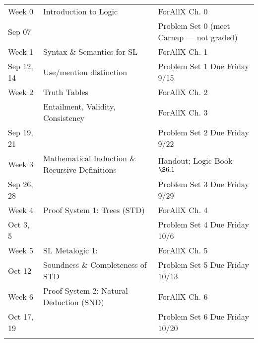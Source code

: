 \documentclass[letterpaper]{inzane_syllabus} %
\begin{document}
\begin{center}
\begin{tabularx}{\textwidth}{p{2.5cm}p{8cm}p{9cm}} %
\arrayrulecolor{myCOLOR}\hline
\multicolumn{3}{l}{\textbf{\textcolor{myCOLOR}{\large Part 1: Sentential Logic}}} \\
\hline

Week 0 & Introduction to Logic & ForAllX Ch. 0 \\
Sep 07 & & Problem Set 0 (meet Carnap --- not graded)\\
\arrayrulecolor{maingray}\hline

Week 1 & Syntax \& Semantics for SL & ForAllX Ch. 1\\
Sep 12, 14 & Use/mention distinction & Problem Set 1 Due Friday 9/15  \\
\arrayrulecolor{maingray}\hline

Week 2 & Truth Tables & ForAllX Ch. 2 \\
& Entailment, Validity, Consistency & ForAllX Ch. 3 \\
Sep 19, 21 & & Problem Set 2 Due Friday 9/22 \\
\arrayrulecolor{maingray}\hline

Week 3 & Mathematical Induction \& Recursive Definitions & Handout; Logic Book $\S6.1$\\
Sep 26, 28 & & Problem Set 3 Due Friday 9/29 \\
\arrayrulecolor{maingray}\hline

Week 4 & Proof System 1: Trees (STD) & ForAllX Ch. 4 \\
Oct 3, 5 & & Problem Set 4 Due Friday 10/6\\
\arrayrulecolor{maingray}\hline

Week 5 & SL Metalogic 1: & ForAllX Ch. 5 \\
Oct 12 & Soundness \& Completeness of STD & Problem Set 5 Due Friday 10/13 \\
\arrayrulecolor{maingray}\hline

Week 6 & Proof System 2: Natural Deduction (SND) & ForAllX Ch. 6 \\
Oct 17, 19 & &  Problem Set 6 Due Friday 10/20\\
\arrayrulecolor{myCOLOR}\hline


\end{tabularx}
\end{center}
\end{document}
